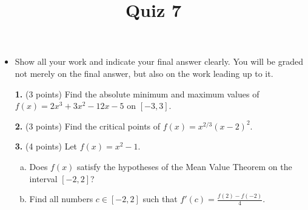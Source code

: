 \documentclass[12pt]{amsart}
\title{Quiz 7}
\begin{document}
\maketitle
\thispagestyle{fancy}

\begin{itemize}
\item Show all your work and indicate your final
answer clearly. You will be graded not merely on the final answer, but also on the work leading up to it.
\end{itemize}
\vskip0.25in
\begin{enumerate}


\item[\textbf{1. }] (3 points) Find the absolute minimum and maximum values of $f(x) = 2x^3 + 3x^2 -12x - 5$ on $[-3,3]$.

\vskip 2in

\item[\textbf{2. }] (3 points) Find the critical points of $f(x) = x^{2/3}(x-2)^2$.

\vskip 2in

\item[\textbf{3. }] (4 points) Let $f(x) = x^2 - 1$.
  \begin{enumerate}[(a)]
    \item Does $f(x)$ satisfy the
      hypotheses of the Mean Value Theorem on the interval $[-2,2]$?
    \item Find all numbers $c \in [-2,2]$ such that $f'(c) = \frac{f(2) - f(-2)}{4}$.
  \end{enumerate}

\end{enumerate}
\end{document}
